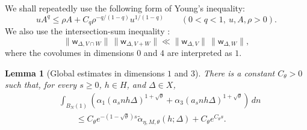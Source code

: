 \documentclass[reqno,11pt]{amsart}
\newtheorem{lem}[lem]{Lemma}
\theoremstyle{definition}
\theoremstyle{remark}
\numberwithin{equation}{section}
\begin{document}
We shall repeatedly use the following form of Young's inequality:
\begin{equation}\label{eq:scaled-young-d2}
uA^q
\le
\rho A
+
C_q\rho^{-q/(1-q)}u^{1/(1-q)}
\qquad
(0<q<1,\ u,A,\rho>0).
\end{equation}
We also use the intersection-sum inequality
\cite[Lemma~5.6]{eskin-margulis-mozes:1998}:
\begin{equation}\label{eq:intersection-sum-d2}
\|\mathsf w_{\Delta,V\cap W}\|\,
\|\mathsf w_{\Delta,V+W}\|
\ll
\|\mathsf w_{\Delta,V}\|\,
\|\mathsf w_{\Delta,W}\|,
\end{equation}
where the covolumes in dimensions $0$ and $4$ are interpreted as $1$.

\begin{lem}[Global estimates in dimensions $1$ and $3$]
\label{lem:d2-noncritical-height-contribution}
There is a constant $C_\theta>0$ such that, for every $s\ge0$, $h\in H$,
and $\Delta\in X$,
\begin{equation}\label{eq:d2-noncritical-tilde-bound}
\begin{aligned}
&\int_{B_N(1)}
\left(
\alpha_1(a_snh\Delta)^{1+\sqrt\theta}
+
\alpha_3(a_snh\Delta)^{1+\sqrt\theta}
\right)\,dn\\
&\qquad\le
C_\theta e^{-(1-\sqrt\theta)s}
\widetilde\alpha_{\eta,M,\theta}(h;\Delta)
+
C_\theta e^{C_\theta s}.
\end{aligned}
\end{equation}
\end{lem}
\end{document}
